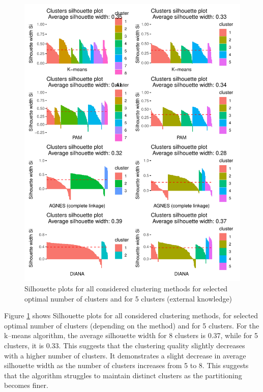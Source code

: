\documentclass[11pt,a4paper]{article}\usepackage[]{graphicx}\usepackage[]{xcolor}
\makeatletter
\def\maxwidth{ %
  \ifdim\Gin@nat@width>\linewidth
    \linewidth
  \else
    \Gin@nat@width
  \fi
}
\newenvironment{knitrout}{}{} %
\makeatother
\begin{document}
\begin{knitrout}
\color{fgcolor}\begin{figure}
\includegraphics[width=\maxwidth]{figure/silhouette_plots_all-1} \caption[Silhouette plots for all considered clustering methods for selected optimal number of clusters and for 5 clusters (external knowledge)]{Silhouette plots for all considered clustering methods for selected optimal number of clusters and for 5 clusters (external knowledge)}\label{fig:silhouette_plots_all}
\end{figure}

\end{knitrout}
		Figure \ref{fig:silhouette_plots_all} shows Silhouette plots for all considered clustering methods, for selected optimal number of clusters (depending on the method) and for 5 clusters. For the k--means algorithm, the average silhouette width for 8 clusters is 0.37, while for 5 clusters, it is 0.33. This suggests that the clustering quality slightly decreases with a higher number of clusters. It demonstrates a slight decrease in average silhouette width as the number of clusters increases from 5 to 8. This suggests that the algorithm struggles to maintain distinct clusters as the partitioning becomes finer.
\end{document}

